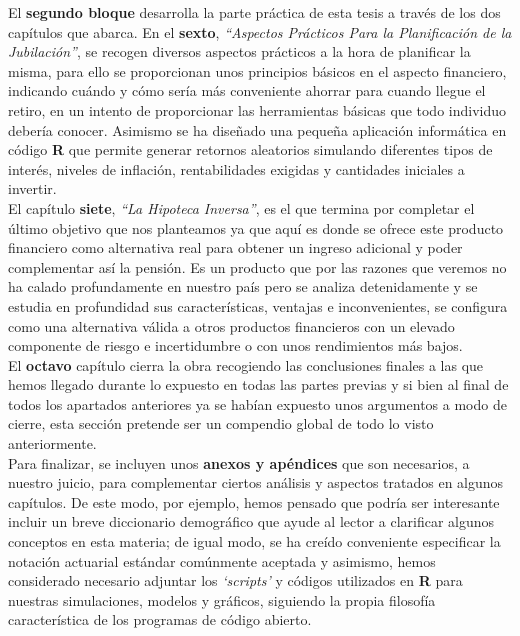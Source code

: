 El \textbf{segundo bloque} desarrolla la parte pr\'actica de esta tesis a través de los dos capítulos que abarca. En el \textbf{sexto}, \textit{``Aspectos Prácticos Para la Planificación de la Jubilación''}, se recogen diversos aspectos prácticos a la hora de planificar la misma, para ello se proporcionan unos principios básicos en el aspecto financiero, indicando cuándo y cómo sería más conveniente ahorrar para cuando llegue el retiro, en un intento de proporcionar las herramientas básicas que todo individuo debería conocer. Asimismo se ha diseñado una pequeña aplicación informática en código \textsf{\textbf{R}} que permite generar retornos aleatorios simulando diferentes tipos de interés, niveles de inflación, rentabilidades exigidas y cantidades iniciales a invertir. \\

El cap\'itulo \textbf{siete}, \textit{``La Hipoteca Inversa''}, es el que termina por completar el último objetivo que nos planteamos ya que aquí es donde se ofrece este producto financiero como alternativa real para obtener un ingreso adicional y poder complementar así la pensión. Es un producto que por las razones que veremos no ha calado profundamente en nuestro país pero se analiza detenidamente y se estudia en profundidad sus características, ventajas e inconvenientes, se configura como una alternativa válida a otros productos financieros con un elevado componente de riesgo e incertidumbre o con unos rendimientos más bajos.\\

El \textbf{octavo} capítulo cierra la obra recogiendo las conclusiones finales a las que hemos llegado durante lo expuesto en todas las partes previas y si bien al final de todos los apartados anteriores ya se habían expuesto unos argumentos a modo de cierre, esta sección pretende ser un compendio global de todo lo visto anteriormente.\\

Para finalizar, se incluyen unos \textbf{anexos y apéndices} que son necesarios, a nuestro juicio, para complementar ciertos análisis y aspectos tratados en algunos capítulos. De este modo, por ejemplo, hemos pensado que podría ser interesante incluir un breve diccionario demográfico que ayude al lector a clarificar algunos conceptos en esta materia; de igual modo, se ha creído conveniente especificar la notación actuarial estándar comúnmente aceptada y asimismo, hemos considerado necesario adjuntar los \textit{`scripts'} y códigos utilizados en \textsf{\textbf{R}} para nuestras simulaciones, modelos y gráficos, siguiendo la propia filosofía característica de los programas de código abierto.\\

